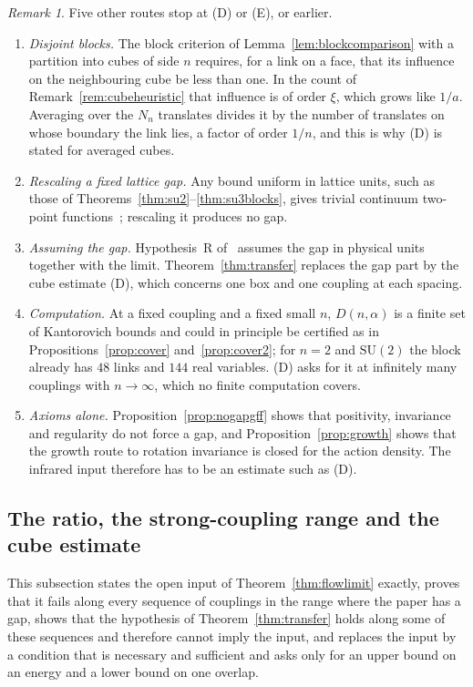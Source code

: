 \documentclass[11pt]{amsart}
\theoremstyle{definition}
\theoremstyle{remark}
\newtheorem{remark}[theorem]{Remark}
\numberwithin{equation}{section}
\newcommand{\SU}{\mathrm{SU}}
\begin{document}
\begin{remark}\label{rem:routes}
Five other routes stop at (D) or (E), or earlier.
\begin{enumerate}[label=\textup{(\alph*)},leftmargin=*]
\item \emph{Disjoint blocks.} The block criterion of
Lemma~\ref{lem:blockcomparison} with a partition into cubes of side $n$
requires, for a link on a face, that its influence on the neighbouring cube
be less than one. In the count of Remark~\ref{rem:cubeheuristic} that
influence is of order $\xi$, which grows like $1/a$. Averaging over the $N_n$
translates divides it by the number of translates on whose boundary the link
lies, a factor of order $1/n$, and this is why (D) is stated for averaged
cubes.
\item \emph{Rescaling a fixed lattice gap.} Any bound uniform in lattice
units, such as those of Theorems~\ref{thm:su2}--\ref{thm:su3blocks}, gives
trivial continuum two-point functions~\cite{BB26b}; rescaling it produces
no gap.
\item \emph{Assuming the gap.} Hypothesis~R of~\cite{BB26b} assumes the gap
in physical units together with the limit. Theorem~\ref{thm:transfer}
replaces the gap part by the cube estimate (D), which concerns one box and
one coupling at each spacing.
\item \emph{Computation.} At a fixed coupling and a fixed small $n$,
$D(n,\alpha)$ is a finite set of Kantorovich bounds and could in principle be
certified as in Propositions~\ref{prop:cover} and~\ref{prop:cover2}; for
$n=2$ and $\SU(2)$ the block already has $48$ links and $144$ real variables.
(D) asks for it at infinitely many couplings with $n\to\infty$, which no
finite computation covers.
\item \emph{Axioms alone.} Proposition~\ref{prop:nogapgff} shows that
positivity, invariance and regularity do not force a gap, and
Proposition~\ref{prop:growth} shows that the growth route to rotation
invariance is closed for the action density. The infrared input therefore
has to be an estimate such as (D).
\end{enumerate}
\end{remark}

\subsection{The ratio, the strong-coupling range and the cube estimate}\label{ssec:ratiocube}

This subsection states the open input of Theorem~\ref{thm:flowlimit}
exactly, proves that it fails along every sequence of couplings in the range
where the paper has a gap, shows that the hypothesis of
Theorem~\ref{thm:transfer} holds along some of these sequences and therefore
cannot imply the input, and replaces the input by a condition that is
necessary and sufficient and asks only for an upper bound on an energy and a
lower bound on one overlap.
\end{document}
